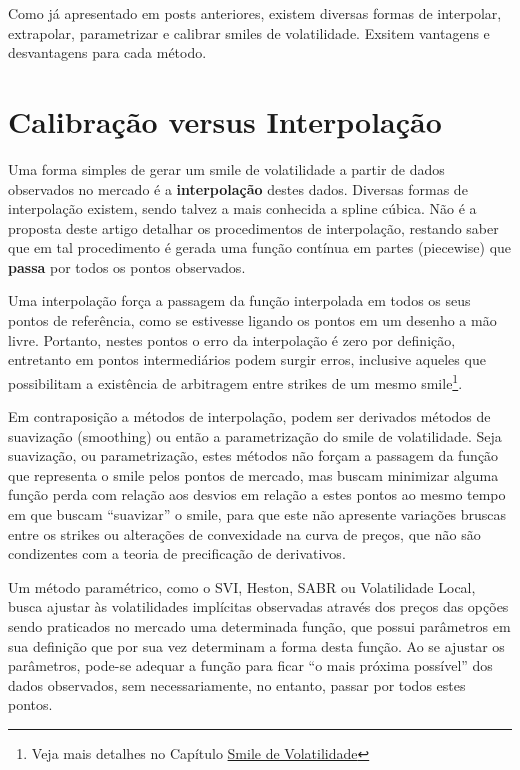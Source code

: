 \documentclass[]{book}
\let\rmarkdownfootnote\footnote%
\def\footnote{\protect\rmarkdownfootnote}
\theoremstyle{definition}
\theoremstyle{definition}
\theoremstyle{definition}
\theoremstyle{remark}
\begin{document}
Como já apresentado em posts anteriores, existem diversas formas de
interpolar, extrapolar, parametrizar e calibrar smiles de volatilidade.
Exsitem vantagens e desvantagens para cada método.

\section{Calibração versus
Interpolação}\label{calibracao-versus-interpolacao}

Uma forma simples de gerar um smile de volatilidade a partir de dados
observados no mercado é a \textbf{interpolação} destes dados. Diversas
formas de interpolação existem, sendo talvez a mais conhecida a spline
cúbica. Não é a proposta deste artigo detalhar os procedimentos de
interpolação, restando saber que em tal procedimento é gerada uma função
contínua em partes (piecewise) que \textbf{passa} por todos os pontos
observados.

Uma interpolação força a passagem da função interpolada em todos os seus
pontos de referência, como se estivesse ligando os pontos em um desenho
a mão livre. Portanto, nestes pontos o erro da interpolação é zero por
definição, entretanto em pontos intermediários podem surgir erros,
inclusive aqueles que possibilitam a existência de arbitragem entre
strikes de um mesmo smile\footnote{Veja mais detalhes no Capítulo
  \protect\hyperlink{arbestatica}{Smile de Volatilidade}}.

Em contraposição a métodos de interpolação, podem ser derivados métodos
de suavização (smoothing) ou então a parametrização do smile de
volatilidade. Seja suavização, ou parametrização, estes métodos não
forçam a passagem da função que representa o smile pelos pontos de
mercado, mas buscam minimizar alguma função perda com relação aos
desvios em relação a estes pontos ao mesmo tempo em que buscam
``suavizar'' o smile, para que este não apresente variações bruscas
entre os strikes ou alterações de convexidade na curva de preços, que
não são condizentes com a teoria de precificação de derivativos.

Um método paramétrico, como o SVI, Heston, SABR ou Volatilidade Local,
busca ajustar às volatilidades implícitas observadas através dos preços
das opções sendo praticados no mercado uma determinada função, que
possui parâmetros em sua definição que por sua vez determinam a forma
desta função. Ao se ajustar os parâmetros, pode-se adequar a função para
ficar ``o mais próxima possível'' dos dados observados, sem
necessariamente, no entanto, passar por todos estes pontos.
\end{document}
